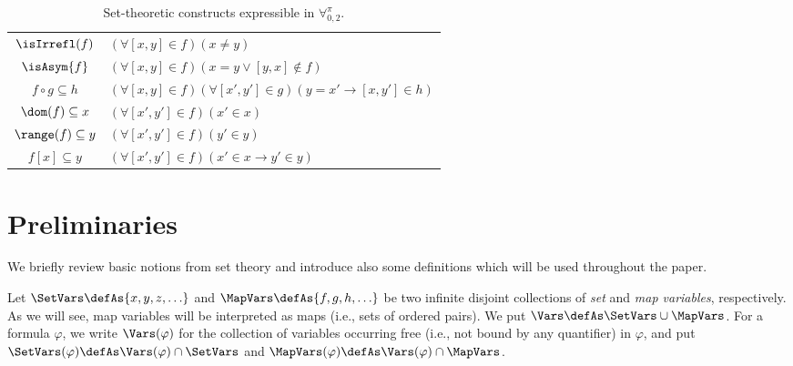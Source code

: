 \documentclass[submission,copyright,creativecommons]{eptcs}
\newcommand{\Lang}{\ensuremath{\mathbf{\forall}^{\pi}_{0,2}}\xspace}
\newcommand{\svx}{x}
\newcommand{\svy}{y}
\newcommand{\svz}{z}
\newcommand{\mvx}{f}
\newcommand{\mvy}{g}
\newcommand{\mvz}{h}
\begin{document}
\begin{table}[h]
\begin{center}
\begin{small}
\begin{tabular}{|c|l|}
$\isIrrefl(\mvx)$ & $(\forall [\svx, \svy] \in \mvx)(\svx \neq \svy)$\\[0.0cm]

$\isAsym{\mvx}$ & $(\forall [\svx, \svy] \in \mvx)(\svx=\svy \vee [\svy, \svx] \notin \mvx)$\\[0.0cm]

$\mvx \circ \mvy \subseteq \mvz$ & $(\forall [\svx, \svy] \in \mvx)(\forall [\svx',\svy'] \in \mvy)(\svy=\svx' \rightarrow [\svx, \svy'] \in \mvz)$\\[0.0cm]

$\dom(\mvx) \subseteq \svx$ & $(\forall [\svx', \svy'] \in \mvx)(\svx' \in \svx)$\\[0.0cm]

$\range(\mvx) \subseteq \svy$ & $(\forall [\svx', \svy'] \in \mvx)(\svy' \in \svy)$\\[0.0cm]

$\mvx[\svx] \subseteq \svy$ & $(\forall [\svx', \svy'] \in 
\mvx)(\svx' \in \svx \rightarrow \svy' \in \svy)$\\[.1cm]
\hline
\end{tabular}
\end{small}
\end{center}
\caption{Set-theoretic constructs expressible in \Lang.}\label{SETCONS}
\end{table}

\section{Preliminaries}\label{PREL}

We briefly review basic notions from set theory and introduce
also some definitions which will be used throughout the paper.

Let $\SetVars \defAs \{\svx, \svy, \svz, \ldots\}$ and
$\MapVars \defAs \{\mvx, \mvy, \mvz, \ldots\}$ be two infinite disjoint
collections of \emph{set} and \emph{map variables},
respectively.  As we will see, map variables will be interpreted as
maps (i.e., sets of ordered pairs).  We put $\Vars \defAs \SetVars 
\cup \MapVars$.
For a formula $\varphi$, we write $\Vars(\varphi)$ for the collection
of variables occurring free (i.e., not bound by any quantifier) in
$\varphi$, and put $\SetVars(\varphi) \defAs \Vars(\varphi) \cap
\SetVars$ and $\MapVars(\varphi) \defAs \Vars(\varphi) \cap \MapVars$.
\end{document}
